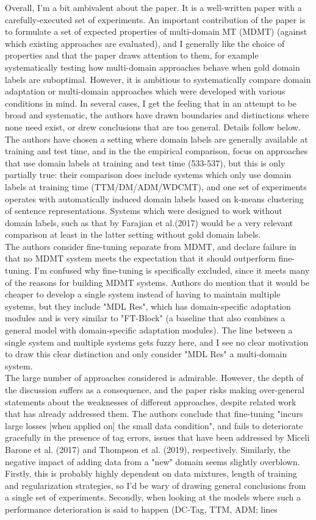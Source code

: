 \documentclass[12pt,times,a4paper,twoside]{article}
\begin{document}
Overall, I'm a bit ambivalent about the paper. It is a well-written paper with a carefully-executed set of experiments. An important contribution of the paper is to formulate a set of expected properties of multi-domain MT (MDMT) (against which existing approaches are evaluated), and I generally like the choice of properties and that the paper draws attention to them, for example systematically testing how multi-domain approaches behave when gold domain labels are suboptimal. However, it is ambitious to systematically compare domain adaptation or multi-domain approaches which were developed with various conditions in mind. In several cases, I get the feeling that in an attempt to be broad and systematic, the authors have drawn boundaries and distinctions where none need exist, or drew conclusions that are too general. Details follow below.
\\
The authors have chosen a setting where domain labels are generally
available at training and test time, and in the the empirical comparison, focus on approaches that use domain labels at training and test time (533-537), but this is only partially true: their comparison does include systems which only use domain labels at training time (TTM/DM/ADM/WDCMT), and one set of experiments operates with automatically induced domain labels based on k-means clustering of sentence representations. Systems which were designed to work without domain labels, such as that by Farajian et al.(2017) would be a very relevant comparison at least in the latter setting without gold domain labels.
\\
The authors consider fine-tuning separate from MDMT, and declare failure in that no MDMT system meets the expectation that it should outperform fine-tuning. I'm confused why fine-tuning is specifically excluded, since it meets many of the reasons for building MDMT systems. Authors do mention that it would be cheaper to develop a single system instead of having to maintain multiple systems, but they include "MDL Res", which has domain-specific adaptation modules and is very similar to "FT-Block" (a baseline that also combines a general model with domain-specific adaptation modules). The line
between a single system and multiple systems gets fuzzy here, and I see no clear motivation to draw this clear distinction and only consider "MDL Res" a multi-domain system.
\\
The large number of approaches considered is admirable. However, the depth of the discussion suffers as a consequence, and the paper risks making over-general statements about the weaknesses of different approaches, despite related work that has already addressed them. The authors conclude that fine-tuning "incurs large losses [when applied on] the small data condition", and fails to deteriorate gracefully in the presence of tag errors, issues that have been addressed by Miceli Barone et al. (2017) and Thompson et al. (2019), respectively. Similarly, the negative impact of adding data from a "new" domain seems slightly overblown. Firstly, this is probably highly dependent on data mixtures, length of training and regularization strategies, so I'd be wary of drawing general conclusions from a single set of experiments. Secondly, when looking at the models where such a performance deterioration is said to happen (DC-Tag, TTM, ADM; lines
\end{document}
